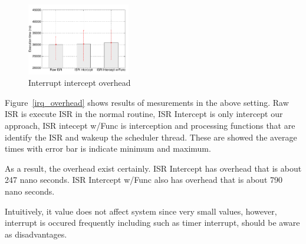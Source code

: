 

\begin{figure}[t]
\begin{center}
\includegraphics[width=0.4\textwidth]{img/interrupt.pdf}
\caption{Interrupt intercept overhead}
\end{center}
\label{fig:irq_overhead}
\end{figure}

Figure~\ref{irq_overhead} shows results of mesurements in the above setting.
Raw ISR is execute ISR in the normal routine, ISR Intercept is only intercept our approach,
ISR intecept w/Func is interception and processing functions that are identify the ISR and wakeup the scheduler thread.
These are showed the average times with error bar is indicate minimum and maximum.

As a result, the overhead exist certainly.
ISR Intercept has overhead that is about 247 nano seconds.
ISR Intercept w/Func also has overhead that is about 790 nano seconds.

Intuitively, it value does not affect system since very small values,
however, interrupt is occured frequently including such as timer interrupt, should be aware as disadvantages.


